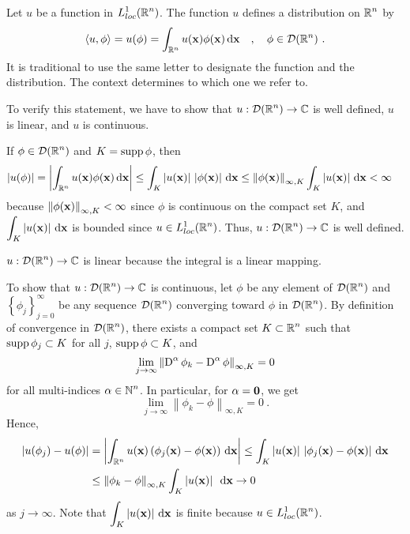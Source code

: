 \begin{egg}
Let $u$ be a function in $\displaystyle L^1_{loc}(\mathbb{R}^n)$.  The
function $u$ defines a distribution on $\displaystyle \mathbb{R}^n$ by
\[
\left\langle{u} , {\phi}\right\rangle = u(\phi) =
\int_{\mathbb{R}^n} u(\mathbf{x}) \phi(\mathbf{x}) \,\mathrm{d}{\mathbf{x}} \quad ,
\quad \phi \in \mathcal{D}(\mathbb{R}^n) \ .
\]
It is traditional to use the same letter to designate the function
and the distribution.  The context determines to which one we refer to.

To verify this statement, we have to show that
$\displaystyle u:\mathcal{D}(\mathbb{R}^n)\rightarrow \mathbb{C}$ is well defined, $u$ is
linear, and $u$ is continuous.

If $\displaystyle \phi \in \mathcal{D}(\mathbb{R}^n)$ and $K = \operatorname{supp} \phi$, then 
\begin{align*}
\left|u(\phi)\right|
&= \left| \int_{\mathbb{R}^n} u(\mathbf{x}) \phi(\mathbf{x}) \,\mathrm{d}{\mathbf{x}} \right|
\leq \int_{K} \left|u(\mathbf{x})\right|\,
\left| \phi(\mathbf{x})\right| \,\mathrm{d}{\mathbf{x}}
\leq \left\|\phi(\mathbf{x})\right\|_{\infty,K}
\int_{K} \left| u(\mathbf{x})\right| \,\mathrm{d}{\mathbf{x}} <\infty
\end{align*}
because
$\displaystyle \left\|\phi(\mathbf{x})\right\|_{\infty,K} < \infty$ since
$\phi$ is continuous on the compact set $K$, and
$\displaystyle \int_{K} \left| u(\mathbf{x})\right| \,\mathrm{d}{\mathbf{x}}$ is bounded
since $\displaystyle u\in L^1_{loc}(\mathbb{R}^n)$.  Thus,
$\displaystyle u:\mathcal{D}(\mathbb{R}^n)\rightarrow \mathbb{C}$ is well defined.

$\displaystyle u:\mathcal{D}(\mathbb{R}^n)\rightarrow \mathbb{C}$ is linear because the integral is a
linear mapping.

To show that $\displaystyle u:\mathcal{D}(\mathbb{R}^n)\rightarrow \mathbb{C}$ is
continuous, let $\phi$ be any element of $\displaystyle \mathcal{D}(\mathbb{R}^n)$ and
$\displaystyle \left\{ \phi_j\right\}_{j=0}^\infty$ be any sequence
$\displaystyle \mathcal{D}(\mathbb{R}^n)$ converging toward $\phi$ in
$\displaystyle \mathcal{D}(\mathbb{R}^n)$.  By definition
of convergence in $\displaystyle \mathcal{D}(\mathbb{R}^n)$, there exists a compact set
$\displaystyle K \subset \mathbb{R}^n$ such that $\operatorname{supp} \phi_j \subset K$ for all $j$,
$\operatorname{supp} \phi \subset K$, and
\[
\lim_{j\rightarrow \infty}
\left\| \operatorname{D}^\alpha \phi_k - \operatorname{D}^\alpha \phi \right\|_{\infty,K} = 0
\]
for all multi-indices $\displaystyle \alpha \in \mathbb{N}^n$.
In particular, for $\alpha = \mathbf{0}$, we get
\[
\lim_{j\rightarrow \infty} \left\| \phi_k - \phi \right\|_{\infty,K} = 0 \ .
\]
Hence,
\begin{align*}
\left|u(\phi_j) - u(\phi)\right| &=
\left| \int_{\mathbb{R}^n} u(\mathbf{x})
\left(\phi_j(\mathbf{x}) - \phi(\mathbf{x})\right) \,\mathrm{d}{\mathbf{x}} \right|
\leq \int_K \left| u(\mathbf{x}) \right|\,
\left|\phi_j(\mathbf{x}) - \phi(\mathbf{x})\right| \,\mathrm{d}{\mathbf{x}} \\
& \leq \left\| \phi_k - \phi \right\|_{\infty,K} 
\int_K \left| u(\mathbf{x}) \right|\ \,\mathrm{d}{\mathbf{x}} \rightarrow 0
\end{align*}
as $j \to \infty$.  Note that
$\displaystyle \int_K \left| u(\mathbf{x}) \right| \,\mathrm{d}{\mathbf{x}}$ is finite
because $\displaystyle u\in L^1_{loc}(\mathbb{R}^n)$.
\end{egg}

